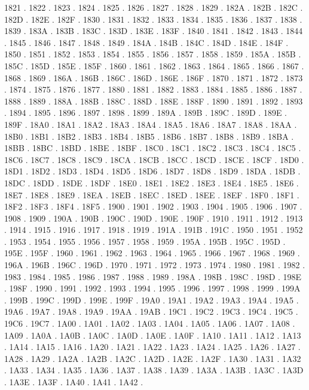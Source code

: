 1821 .
1822 .
1823 .
1824 .
1825 .
1826 .
1827 .
1828 .
1829 .
182A .
182B .
182C .
182D .
182E .
182F .
1830 .
1831 .
1832 .
1833 .
1834 .
1835 .
1836 .
1837 .
1838 .
1839 .
183A .
183B .
183C .
183D .
183E .
183F .
1840 .
1841 .
1842 .
1843 .
1844 .
1845 .
1846 .
1847 .
1848 .
1849 .
184A .
184B .
184C .
184D .
184E .
184F .
1850 .
1851 .
1852 .
1853 .
1854 .
1855 .
1856 .
1857 .
1858 .
1859 .
185A .
185B .
185C .
185D .
185E .
185F .
1860 .
1861 .
1862 .
1863 .
1864 .
1865 .
1866 .
1867 .
1868 .
1869 .
186A .
186B .
186C .
186D .
186E .
186F .
1870 .
1871 .
1872 .
1873 .
1874 .
1875 .
1876 .
1877 .
1880 .
1881 .
1882 .
1883 .
1884 .
1885 .
1886 .
1887 .
1888 .
1889 .
188A .
188B .
188C .
188D .
188E .
188F .
1890 .
1891 .
1892 .
1893 .
1894 .
1895 .
1896 .
1897 .
1898 .
1899 .
189A .
189B .
189C .
189D .
189E .
189F .
18A0 .
18A1 .
18A2 .
18A3 .
18A4 .
18A5 .
18A6 .
18A7 .
18A8 .
18AA .
18B0 .
18B1 .
18B2 .
18B3 .
18B4 .
18B5 .
18B6 .
18B7 .
18B8 .
18B9 .
18BA .
18BB .
18BC .
18BD .
18BE .
18BF .
18C0 .
18C1 .
18C2 .
18C3 .
18C4 .
18C5 .
18C6 .
18C7 .
18C8 .
18C9 .
18CA .
18CB .
18CC .
18CD .
18CE .
18CF .
18D0 .
18D1 .
18D2 .
18D3 .
18D4 .
18D5 .
18D6 .
18D7 .
18D8 .
18D9 .
18DA .
18DB .
18DC .
18DD .
18DE .
18DF .
18E0 .
18E1 .
18E2 .
18E3 .
18E4 .
18E5 .
18E6 .
18E7 .
18E8 .
18E9 .
18EA .
18EB .
18EC .
18ED .
18EE .
18EF .
18F0 .
18F1 .
18F2 .
18F3 .
18F4 .
18F5 .
1900 .
1901 .
1902 .
1903 .
1904 .
1905 .
1906 .
1907 .
1908 .
1909 .
190A .
190B .
190C .
190D .
190E .
190F .
1910 .
1911 .
1912 .
1913 .
1914 .
1915 .
1916 .
1917 .
1918 .
1919 .
191A .
191B .
191C .
1950 .
1951 .
1952 .
1953 .
1954 .
1955 .
1956 .
1957 .
1958 .
1959 .
195A .
195B .
195C .
195D .
195E .
195F .
1960 .
1961 .
1962 .
1963 .
1964 .
1965 .
1966 .
1967 .
1968 .
1969 .
196A .
196B .
196C .
196D .
1970 .
1971 .
1972 .
1973 .
1974 .
1980 .
1981 .
1982 .
1983 .
1984 .
1985 .
1986 .
1987 .
1988 .
1989 .
198A .
198B .
198C .
198D .
198E .
198F .
1990 .
1991 .
1992 .
1993 .
1994 .
1995 .
1996 .
1997 .
1998 .
1999 .
199A .
199B .
199C .
199D .
199E .
199F .
19A0 .
19A1 .
19A2 .
19A3 .
19A4 .
19A5 .
19A6 .
19A7 .
19A8 .
19A9 .
19AA .
19AB .
19C1 .
19C2 .
19C3 .
19C4 .
19C5 .
19C6 .
19C7 .
1A00 .
1A01 .
1A02 .
1A03 .
1A04 .
1A05 .
1A06 .
1A07 .
1A08 .
1A09 .
1A0A .
1A0B .
1A0C .
1A0D .
1A0E .
1A0F .
1A10 .
1A11 .
1A12 .
1A13 .
1A14 .
1A15 .
1A16 .
1A20 .
1A21 .
1A22 .
1A23 .
1A24 .
1A25 .
1A26 .
1A27 .
1A28 .
1A29 .
1A2A .
1A2B .
1A2C .
1A2D .
1A2E .
1A2F .
1A30 .
1A31 .
1A32 .
1A33 .
1A34 .
1A35 .
1A36 .
1A37 .
1A38 .
1A39 .
1A3A .
1A3B .
1A3C .
1A3D .
1A3E .
1A3F .
1A40 .
1A41 .
1A42 .
